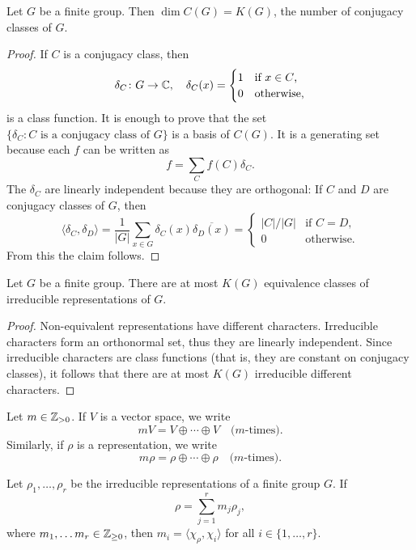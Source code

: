\begin{proposition}
    Let $G$ be a finite group. Then $\dim C(G)=K(G)$, the number of conjugacy classes of $G$.
\end{proposition}

\begin{proof}
If $C$ is a conjugacy class, 
then 
\[
\delta_C\colon G\to\mathbb{C},\quad
\delta_C(x)=\begin{cases}
    1 & \text{if $x\in C$,}\\
    0 & \text{otherwise,}
\end{cases}
\]
is a class function.  
It is enough to prove that the 
set $\{\delta_C:C\text{ is a conjugacy class of $G$}\}$ is a basis of $C(G)$.  It is a generating set
because each $f$ can be written as 
\[
f=\sum_{C}f(C)\delta_C.
\]
The $\delta_C$ are linearly independent because they are orthogonal: 
If $C$ and $D$ 
are conjugacy classes of $G$, then 
\[
\langle\delta_C,\delta_D\rangle=\frac{1}{|G|}\sum_{x\in G}\delta_C(x)\overline{\delta_D(x)}
=\begin{cases}
|C|/|G| & \text{if $C=D$},\\
0 & \text{otherwise}.
\end{cases}
\]
From this the claim follows. 
\end{proof}


\begin{corollary}
    Let $G$ be a finite group. There are at most $K(G)$ equivalence classes of irreducible representations of $G$.
\end{corollary}

\begin{proof}
    Non-equivalent representations have different characters. 
    Irreducible characters 
    form an orthonormal set, thus they are linearly 
    independent. Since irreducible characters
    are class functions (that is, they are constant on conjugacy classes), 
    it follows that there are at most $K(G)$ irreducible different characters.  
\end{proof}

Let $m\in\mathbb{Z}_{>0}$. If $V$ is a vector space, we 
write \[
mV=V\oplus\cdots\oplus V\quad\text{($m$-times)}.
\]
Similarly,
if $\rho$ is a representation, 
we write 
\[
m\rho=\rho\oplus\cdots\oplus\rho\quad\text{($m$-times)}.
\]

\begin{theorem}
    Let $\rho_1,\dots,\rho_r$ be the irreducible representations of a finite group $G$. If 
	\[ 
    \rho=\sum_{j=1}^rm_j\rho_j,
    \]
    where $m_1,\dots m_r\in\mathbb{Z}_{\geq0}$, then
    $m_i=\langle \chi_\rho,\chi_i\rangle$ for all $i\in\{1,\dots,r\}$. 
\end{theorem}

